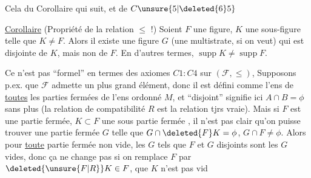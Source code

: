 
Cela  du Corollaire qui suit, et de $C\unsure{5|\deleted{6}5}$

\uline{Corollaire} (Propriété de la relation $\leq$ !) Soient $F$ une figure, $K$ une sous-figure  telle que $K\neq F$. Alors il existe une  figure $G$ (une multistrate, si on veut) qui est  disjointe de $K$, mais non de $F$. En d'autres termes, $\operatorname{supp} K\neq\operatorname{supp} F$.

Ce n'est pas ``formel'' en termes des axiomes $C1 : C4$ sur $(\mathcal F,\leq)$, Supposons p.ex. que $\mathcal F$ admette un plus grand élément, donc il est défini comme l'ens de \uline{toutes} les parties fermées de l'ens ordonné $M$, et ``disjoint'' signifie ici $A\cap B=\phi$ sans plus (la relation de compatibilité $R$ est la relation tjrs vraie). Mais si $F$ est une partie fermée, $K\subset F$ une sous partie fermée , il n'est pas clair qu'on puisse trouver une partie fermée $G$ telle que $G\cap\deleted{F}K=\phi$, $G\cap F\neq\phi$.   Alors pour \uline{toute} partie fermée non vide, les $G$ tels que $F$ et $G$ disjoints sont les $G$ vides, donc ça ne change pas si on remplace $F$ par $\deleted{\unsure{F|R}}K\in F$,  que $K$ n'est pas vid
